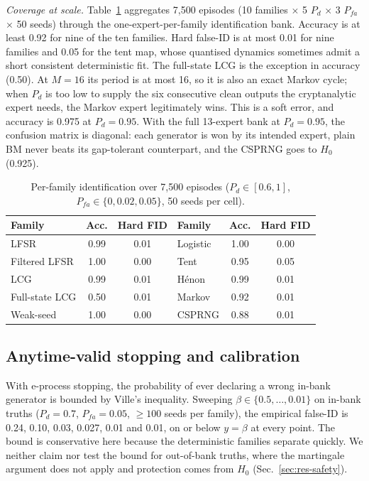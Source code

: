 \emph{Coverage at scale.} Table~\ref{tab:coverage} aggregates 7{,}500 episodes
(10 families $\times$ 5 $P_d$ $\times$ 3 $P_{fa}$ $\times$ 50 seeds) through the
one-expert-per-family identification bank. Accuracy is at least 0.92 for nine of
the ten families. Hard false-ID is at most 0.01 for nine families and 0.05 for
the tent map, whose quantised dynamics sometimes admit a short consistent
deterministic fit. The full-state LCG is the exception in accuracy (0.50). At
$M=16$ its period is at most 16, so it is also an exact Markov cycle; when $P_d$
is too low to supply the six consecutive clean outputs the cryptanalytic expert
needs, the Markov expert legitimately wins. This is a soft error, and accuracy
is 0.975 at $P_d=0.95$. With the full 13-expert bank at $P_d=0.95$, the
confusion matrix is diagonal: each generator is won by its intended expert,
plain BM never beats its gap-tolerant counterpart, and the CSPRNG goes to $H_0$
(0.925).

\begin{table}[t]
\centering
\caption{Per-family identification over 7{,}500 episodes
($P_d\in[0.6,1]$, $P_{fa}\in\{0,0.02,0.05\}$, 50 seeds per cell).}
\label{tab:coverage}
\begin{tabular}{lcc|lcc}
\toprule
Family & Acc. & Hard FID & Family & Acc. & Hard FID \\
\midrule
LFSR          & 0.99 & 0.01 & Logistic & 1.00 & 0.00 \\
Filtered LFSR & 1.00 & 0.00 & Tent     & 0.95 & 0.05 \\
LCG           & 0.99 & 0.01 & H\'enon  & 0.99 & 0.01 \\
Full-state LCG& 0.50 & 0.01 & Markov   & 0.92 & 0.01 \\
Weak-seed     & 1.00 & 0.00 & CSPRNG   & 0.88 & 0.01 \\
\bottomrule
\end{tabular}
\end{table}

\subsection{Anytime-valid stopping and calibration}
\label{sec:res-guarantee}

With e-process stopping, the probability of ever declaring a wrong in-bank
generator is bounded by Ville's inequality. Sweeping
$\beta\in\{0.5,\dots,0.01\}$ on in-bank truths ($P_d=0.7$, $P_{fa}=0.05$,
$\ge100$ seeds per family), the empirical false-ID is 0.24, 0.10, 0.03, 0.027,
0.01 and 0.01\stale{}, on or below $y=\beta$ at every point. The bound is
conservative here because the deterministic families separate quickly. We
neither claim nor test the bound for out-of-bank truths, where the martingale
argument does not apply and protection comes from $H_0$
(Sec.~\ref{sec:res-safety}).

